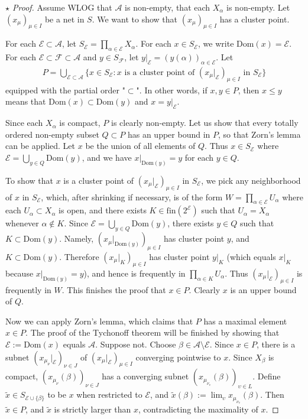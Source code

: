\documentclass[12pt,b5paper,notitlepage]{article}
\theoremstyle{definition}
\theoremstyle{plain}
\newcommand{\wtd}{\widetilde}
\newcommand{\Domain}{\mathrm{Dom}}
\newcommand{\scr}{\mathscr}
\newcommand{\fin}{\mathrm{fin}}
\numberwithin{equation}{section}
\begin{document}
\begin{proof}[$\star$ Proof]
Assume WLOG that $\scr A$ is non-empty, that each $X_\alpha$ is non-empty. Let $(x_\mu)_{\mu\in I}$ be a net in $S$. We want to show that $(x_\mu)_{\mu\in I}$ has a cluster point.

For each $\scr E\subset\scr A$, let $S_{\scr E}=\prod_{\alpha\in\scr E}X_\alpha$. For each $x\in S_{\scr E}$, we write $\Domain(x)=\scr E$.  For each $\scr E\subset\scr F\subset\scr A$ and $y\in S_{\scr F}$, let $y|_{\scr E}=(y(\alpha))_{\alpha\in\scr E}$. Let
\begin{align*}
P=\bigcup_{\scr E\subset\scr A}\big\{x\in S_{\scr E}:x\text{ is a cluster point of $(x_\mu|_{\scr E})_{\mu\in I}$ in $S_{\scr E}$} \big\}
\end{align*} 
equipped with the partial order "$\subset$". In other words, if $x,y\in P$, then $x\leq y$ means that $\Domain(x)\subset\Domain(y)$ and $x=y|_{\scr E}$.

Since each $X_\alpha$ is compact, $P$ is clearly non-empty. Let us show that every totally ordered non-empty subset $Q\subset P$ has an upper bound in $P$, so that Zorn's lemma can be applied. Let $x$ be the union of all elements of $Q$. Thus $x\in S_{\scr E}$ where $\scr E=\bigcup_{y\in Q}\Domain(y)$, and we have $x|_{\Domain(y)}=y$ for each $y\in Q$. 

To show that $x$ is a cluster point of $(x_\mu|_{\scr E})_{\mu\in I}$ in $S_{\scr E}$, we pick any neighborhood of $x$ in $S_{\scr E}$, which, after shrinking if necessary, is of the form $W=\prod_{\alpha\in\scr E}U_\alpha$ where each $U_\alpha\subset X_\alpha$ is open, and there exists $K\in\fin(2^{\scr E})$ such that $U_\alpha=X_\alpha$ whenever $\alpha\notin K$. Since $\scr E=\bigcup_{y\in Q}\Domain(y)$, there exists $y\in Q$ such that $K\subset\Domain(y)$. Namely,   $(x_\mu|_{\Domain(y)})_{\mu\in I}$ has cluster point $y$, and $K\subset\Domain(y)$. Therefore $(x_\mu|_K)_{\mu\in I}$ has cluster point $y|_K$ (which equals $x|_K$ because $x|_{\Domain(y)}=y$), and hence is frequently in $\prod_{\alpha\in K}U_\alpha$. Thus $(x_\mu|_{\scr E})_{\mu\in I}$ is frequently in $W$. This finishes the proof that $x\in P$. Clearly $x$ is an upper bound of $Q$.

Now we can apply Zorn's lemma, which claims that $P$ has a maximal element $x\in P$. The proof of the Tychonoff theorem will be finished by showing that $\scr E:=\Domain(x)$ equals $\scr A$. Suppose not. Choose $\beta\in\scr A\setminus\scr E$. Since $x\in P$, there is a subnet $(x_{\mu_\nu}|_{\scr E})_{\nu\in J}$ of $(x_\mu|_{\scr E})_{\mu\in I}$ converging pointwise to $x$. Since $X_\beta$ is compact, $(x_{\mu_\nu}(\beta))_{\nu\in J}$ has a converging subnet $(x_{\mu_{\nu_\upsilon}}(\beta))_{\upsilon\in L}$. Define $\wtd x\in S_{\scr E\cup\{\beta\}}$ to be $x$ when restricted to $\scr E$, and $\wtd x(\beta):=\lim_\upsilon x_{\mu_{\nu_\upsilon}}(\beta)$. Then $\wtd x\in P$, and $\wtd x$ is strictly larger than $x$, contradicting the maximality of $x$.
\end{proof}
\end{document}
